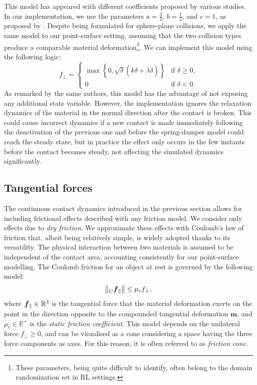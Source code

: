 This model has appeared with different coefficients proposed by various studies.
In our implementation, we use the parameters $a = \frac{3}{2}$, $b=\frac{1}{2}$, and $c=1$, as proposed by \textcite{azad_modeling_2010}.
Despite being formulated for sphere-plane collisions, we apply the same model to our point-surface setting,
assuming that the two collision types produce a comparable material deformation\footnote{These parameters, being quite difficult to identify, often belong to the domain randomization set in \ac{RL} settings.}.
We can implement this model using the following logic:
%
\begin{equation}
    \label{eq:soft_contact_normal_force}
    f_\perp = 
    \begin{cases}
        \max\left\{ 0, \sqrt\delta (k \delta + \lambda \dot\delta) \right\} & \text{if $\delta\geq0$,} \\
        0 & \text{if $\delta<0$.}
    \end{cases}
\end{equation}
%
As remarked by the same authors, this model has the advantage of not exposing any additional state variable.
However, the implementation ignores the relaxation dynamics of the material in the normal direction after the contact is broken.
This could cause incorrect dynamics if a new contact is made immediately following the deactivation of the previous one and before the spring-damper model could reach the steady state, but in practice the effect only occurs in the few instants before the contact becomes steady, not affecting the simulated dynamics significantly.

\subsection{Tangential forces}

The continuous contact dynamics introduced in the previous section allows for including frictional effects described with any friction model.
We consider only effects due to \emph{dry friction}.
We approximate these effects with Coulomb's law of friction that, albeit being relatively simple, is widely adopted thanks to its versatility.
The physical interaction between two materials is assumed to be independent of the contact area, accounting consistently for our point-surface modelling.
The Coulomb friction for an object at rest is governed by the following model:
%
\begin{equation*}
    \norm{\forcelin[C]_\parallel} \leq \mu_c f_\perp
    ,
\end{equation*}
%
where $\forcelin_\parallel \in \mathbb{R}^3$ is the tangential force that the material deformation exerts on the point in the direction opposite to the compounded tangential deformation $\mathbf{m}$, and $\mu_c \in \mathbb{R}^+$ is the \emph{static friction coefficient}.
This model depends on the unilateral force $f_\perp \geq 0$, and can be visualised as a cone considering a space having the three force components as axes.
For this reason, it is often referred to as \emph{friction cone}.

